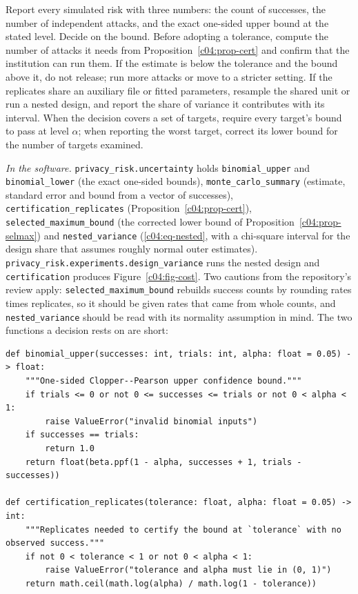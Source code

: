 \begin{inpractice}\sloppy
Report every simulated risk with three numbers: the count of successes, the number of
independent attacks, and the exact one-sided upper bound at the stated level. Decide on
the bound. Before adopting a tolerance, compute the number of attacks it needs from
Proposition~\ref{c04:prop-cert} and confirm that the institution can run them. If the
estimate is below the tolerance and the bound above it, do not release; run more attacks
or move to a stricter setting. If the replicates share an auxiliary file or fitted
parameters, resample the shared unit or run a nested design, and report the share of
variance it contributes with its interval. When the decision covers a set of targets,
require every target's bound to pass at level $\alpha$; when reporting the worst target,
correct its lower bound for the number of targets examined.

\smallskip\noindent\textit{In the software.} \texttt{privacy\_risk.uncertainty} holds
\texttt{binomial\_upper} and \texttt{binomial\_lower} (the exact one-sided bounds),
\texttt{monte\_carlo\_summary} (estimate, standard error and bound from a vector of
successes), \texttt{certification\_replicates} (Proposition~\ref{c04:prop-cert}),
\texttt{selected\_maximum\_bound} (the corrected lower bound of
Proposition~\ref{c04:prop-selmax}) and \texttt{nested\_variance}
(\eqref{c04:eq-nested}, with a chi-square interval for the design share that assumes
roughly normal outer estimates). \texttt{privacy\_risk.experiments.design\_variance}
runs the nested design and \texttt{certification} produces
Figure~\ref{c04:fig-cost}. Two cautions from the repository's review apply:
\texttt{selected\_maximum\_bound} rebuilds success counts by rounding rates times
replicates, so it should be given rates that came from whole counts, and
\texttt{nested\_variance} should be read with its normality assumption in mind. The two
functions a decision rests on are short:
\begin{lstlisting}
def binomial_upper(successes: int, trials: int, alpha: float = 0.05) -> float:
    """One-sided Clopper--Pearson upper confidence bound."""
    if trials <= 0 or not 0 <= successes <= trials or not 0 < alpha < 1:
        raise ValueError("invalid binomial inputs")
    if successes == trials:
        return 1.0
    return float(beta.ppf(1 - alpha, successes + 1, trials - successes))

def certification_replicates(tolerance: float, alpha: float = 0.05) -> int:
    """Replicates needed to certify the bound at `tolerance` with no observed success."""
    if not 0 < tolerance < 1 or not 0 < alpha < 1:
        raise ValueError("tolerance and alpha must lie in (0, 1)")
    return math.ceil(math.log(alpha) / math.log(1 - tolerance))
\end{lstlisting}
\end{inpractice}

